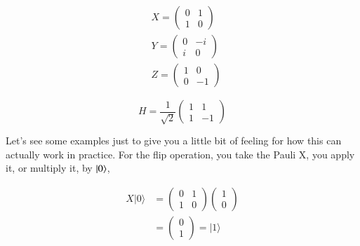 \begin{equation}
\begin{aligned}
&X=\left(\begin{array}{ll}
0 & 1 \\
1 & 0
\end{array}\right) \\
&Y=\left(\begin{array}{cc}
0 & -i \\
i & 0
\end{array}\right) \\
&Z=\left(\begin{array}{cc}
1 & 0 \\
0 & -1
\end{array}\right)
\end{aligned}
\end{equation}

\begin{equation}
H=\frac{1}{\sqrt{2}}\left(\begin{array}{cc}
1 & 1 \\
1 & -1
\end{array}\right)
\end{equation}


Let's see some examples just to give you a little bit of feeling for how this can actually work in practice. For the flip operation, you take the Pauli X, you apply it, or multiply it, by $\left| 0 \right\rangle$,

\begin{equation}
\begin{aligned}
X|0\rangle &=\left(\begin{array}{ll}
0 & 1 \\
1 & 0
\end{array}\right)\left(\begin{array}{l}
1 \\
0
\end{array}\right) \\
&=\left(\begin{array}{l}
0 \\
1
\end{array}\right)=|1\rangle
\end{aligned}
\end{equation}


